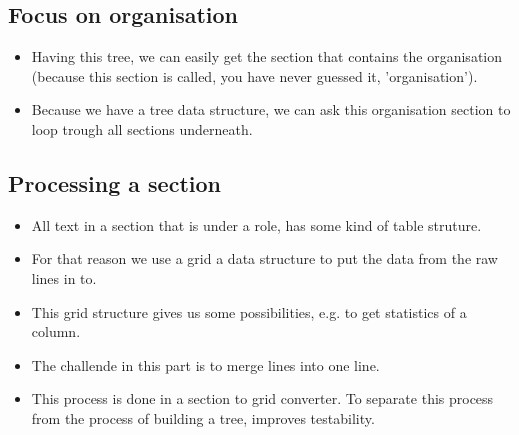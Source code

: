 \documentclass{ou-report}
\begin{document}
\subsection{Focus on organisation}
\begin{itemize}
    \item Having this tree, we can easily get the section that contains the 
        organisation (because this section is called, you have never guessed it, 
        'organisation').
    \item Because we have a tree data structure, we can ask this organisation 
        section to loop trough all sections underneath.
\end{itemize}

\subsection{Processing a section}
\begin{itemize}
    \item All text in a section that is under a role, has some kind of table 
        struture.
    \item For that reason we use a grid a data structure to put the data from 
        the raw lines in to.
    \item This grid structure gives us some possibilities, e.g. to get 
        statistics of a column.
    \item The challende in this part is to merge lines into one line.
    \item This process is done in a section to grid converter. To separate this
        process from the process of building a tree, improves testability.
\end{itemize}
\end{document}
